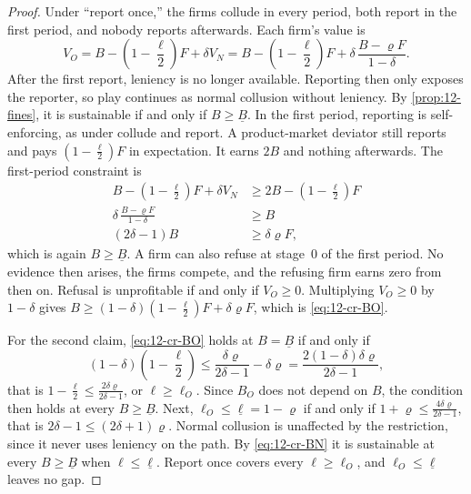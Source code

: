 \begin{proof}
Under ``report once,'' the firms collude in every period, both report in the first period, and nobody reports
afterwards. Each firm's value is
\begin{equation*}
V_O = B - \left(1 - \frac{\ell}{2}\right)F + \delta V_N
= B - \left(1 - \frac{\ell}{2}\right)F + \delta\,\frac{B - \varrho F}{1-\delta}.
\end{equation*}
After the first report, leniency is no longer available. Reporting then only exposes the reporter, so play continues
as normal collusion without leniency. By \cref{prop:12-fines}, it is sustainable if and only if $B \ge \underline B$.
In the first period, reporting is self-enforcing, as under collude and report. A product-market deviator still
reports and pays $(1 - \frac{\ell}{2})F$ in expectation. It earns $2B$ and nothing afterwards. The first-period
constraint is
\begin{align*}
B - \left(1 - \frac{\ell}{2}\right)F + \delta V_N &\ge 2B - \left(1 - \frac{\ell}{2}\right)F\\
\delta\,\frac{B - \varrho F}{1-\delta} &\ge B\\
(2\delta - 1)B &\ge \delta\varrho F,
\end{align*}
which is again $B \ge \underline B$. A firm can also refuse at stage~0 of the first period. No evidence then arises,
the firms compete, and the refusing firm earns zero from then on. Refusal is unprofitable if and only if $V_O \ge 0$.
Multiplying $V_O \ge 0$ by $1 - \delta$ gives $B \ge (1-\delta)(1 - \frac{\ell}{2})F + \delta\varrho F$, which is
\eqref{eq:12-cr-BO}.

For the second claim, \eqref{eq:12-cr-BO} holds at $B = \underline B$ if and only if
\begin{equation*}
(1-\delta)\left(1 - \frac{\ell}{2}\right) \le \frac{\delta\varrho}{2\delta - 1} - \delta\varrho
= \frac{2(1-\delta)\delta\varrho}{2\delta - 1},
\end{equation*}
that is $1 - \frac{\ell}{2} \le \frac{2\delta\varrho}{2\delta - 1}$, or $\ell \ge \ell_O$. Since $B_O$ does not
depend on $B$, the condition then holds at every $B \ge \underline B$. Next, $\ell_O \le \underline\ell = 1 - \varrho$
if and only if $1 + \varrho \le \frac{4\delta\varrho}{2\delta - 1}$, that is $2\delta - 1 \le (2\delta + 1)\varrho$.
Normal collusion is unaffected by the restriction, since it never uses leniency on the path. By
\eqref{eq:12-cr-BN} it is sustainable at every $B \ge \underline B$ when $\ell \le \underline\ell$. Report once covers
every $\ell \ge \ell_O$, and $\ell_O \le \underline\ell$ leaves no gap.
\end{proof}

